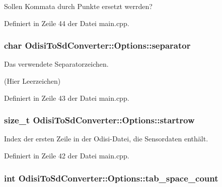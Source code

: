 Sollen Kommata durch Punkte ersetzt werrden? 



Definiert in Zeile 44 der Datei main.\-cpp.

\hypertarget{structOdisiToSdConverter_1_1Options_ae4c74d1fdfbaf37eb4b38f4b684cfa31}{
\subsubsection[{separator}]{\setlength{\rightskip}{0pt plus 5cm}char Odisi\-To\-Sd\-Converter\-::\-Options\-::separator}}\label{structOdisiToSdConverter_1_1Options_ae4c74d1fdfbaf37eb4b38f4b684cfa31}


Das verwendete Separatorzeichen. 

(Hier Leerzeichen) 

Definiert in Zeile 43 der Datei main.\-cpp.

\hypertarget{structOdisiToSdConverter_1_1Options_acb8ca8c36555d0fa3d1b87e2c8800fe6}{
\subsubsection[{startrow}]{\setlength{\rightskip}{0pt plus 5cm}size\-\_\-t Odisi\-To\-Sd\-Converter\-::\-Options\-::startrow}}\label{structOdisiToSdConverter_1_1Options_acb8ca8c36555d0fa3d1b87e2c8800fe6}


Index der ersten Zeile in der Odisi-\/\-Datei, die Sensordaten enthält. 



Definiert in Zeile 42 der Datei main.\-cpp.

\hypertarget{structOdisiToSdConverter_1_1Options_a7dda0229b360a29cd7e4b1ed26e2e71d}{
\subsubsection[{tab\-\_\-space\-\_\-count}]{\setlength{\rightskip}{0pt plus 5cm}int Odisi\-To\-Sd\-Converter\-::\-Options\-::tab\-\_\-space\-\_\-count}}\label{structOdisiToSdConverter_1_1Options_a7dda0229b360a29cd7e4b1ed26e2e71d}


